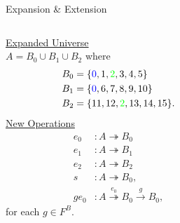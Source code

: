 \begin{frame}[fragile,label=OA-abridged-slide1,shrink=5]{Expansion \& Extension}


  \begin{columns}
    \begin{column}{0.3\textwidth}
      \vskip1cm   
      \begin{center}
        \underline{Expanded Universe}\\[5pt]
        $A = B_0 \cup B_1 \cup B_2$ where
        \begin{align*}
          B_0 &= \{ {\color{blue}0}, 1, {\color{green}2}, 3, 4, 5\}\\
          B_1 &= \{{\color{blue}0}, 6, 7, 8, 9, 10\}\\
          B_2 &= \{ 11, 12, {\color{green}2}, 13, 14, 15\}.
        \end{align*}
        \vskip5pt
        \underline{New Operations}
        \begin{align*}
          e_0 & : A \twoheadrightarrow B_0 \\
          e_1 & : A \twoheadrightarrow B_1\\
          e_2 &: A \twoheadrightarrow B_2 \\
          s  &: A \twoheadrightarrow B_0,\\
          g e_0 &: A \stackrel{e_0}{\twoheadrightarrow} B_0
          \stackrel{g}{\rightarrow} B_0,
        \end{align*}
        for each $g \in F^B$.
      \end{center}
    \end{column}

    \begin{column}{0.4\textwidth}
    \end{column}
  \end{columns}
        
\end{frame}


